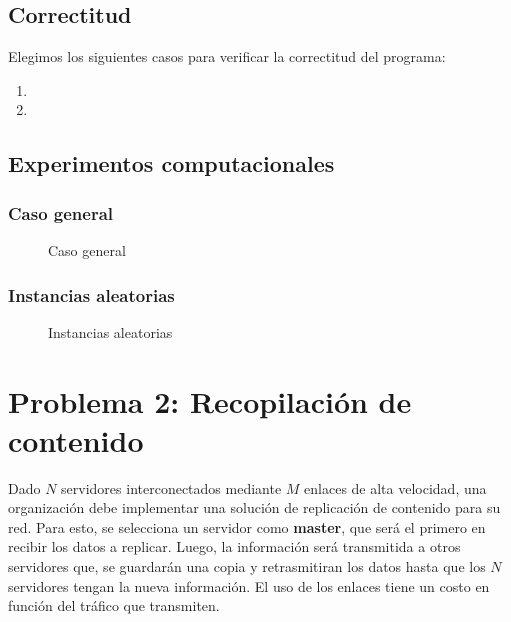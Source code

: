 \documentclass[a4paper, 10pt, twoside]{article}
\newcommand{\tresgraficos}[3]{
    \newcommand{\separacion}{-2.2em}
    \vspace{\separacion}
    
    \vspace{\separacion}
    
    \vspace{\separacion}
    
}
\begin{document}
\subsection{Correctitud}

Elegimos los siguientes casos para verificar la correctitud del programa:

\begin{enumerate}
\item{}
\item{}
\end{enumerate}


\subsection{Experimentos computacionales}


\subsubsection{Caso general}

\begin{figure}[H]
  \centering
  \tresgraficos{problema1-caso-general}
               {problema1-caso-general-n}
               {problema1-caso-general-n2}
  \caption{Caso general}
\end{figure}


\subsubsection{Instancias aleatorias}

\begin{figure}[H]
  \centering
  \tresgraficos{problema1-instancias-aleatorias}
               {problema1-instancias-aleatorias-n}
               {problema1-instancias-aleatorias-n2}
  \caption{Instancias aleatorias}
\end{figure}




\newpage

\section{Problema 2: Recopilación de contenido}

Dado $N$ servidores interconectados mediante $M$ enlaces de alta velocidad, una organización debe implementar una solución de replicación de contenido para su red. Para esto, se selecciona un servidor como \textbf{master}, que será el primero en recibir los datos a replicar. Luego, la información será transmitida a otros servidores que, se guardarán una copia y retrasmitiran los datos hasta que los $N$ servidores tengan la nueva información. El uso de los enlaces tiene un costo en función del tráfico que transmiten.
\end{document}
